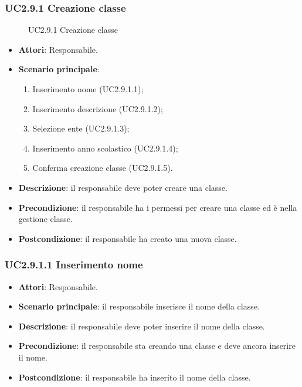 \subsubsection{UC2.9.1 Creazione classe}
\begin{figure}[H]
\centering
\noindent{}
\caption{UC2.9.1 Creazione classe}
\end{figure}
\begin{itemize}
\item \textbf{Attori}: Responsabile.
\item \textbf{Scenario principale}:
\begin{enumerate}
\item Inserimento nome (UC2.9.1.1);
\item Inserimento descrizione (UC2.9.1.2);
\item Selezione ente (UC2.9.1.3);
\item Inserimento anno scolastico (UC2.9.1.4);
\item Conferma creazione classe (UC2.9.1.5).
\end{enumerate}
\item \textbf{Descrizione}: il responsabile deve poter creare una classe.
\item \textbf{Precondizione}: il responsabile ha i permessi per creare una classe ed è nella gestione classe.
\item \textbf{Postcondizione}: il responsabile ha creato una nuova classe.
\end{itemize}
\subsubsection{UC2.9.1.1 Inserimento nome}
\begin{itemize}
\item \textbf{Attori}: Responsabile.
\item \textbf{Scenario principale}: il responsabile inserisce il nome della classe.
\item \textbf{Descrizione}: il responsabile deve poter inserire il nome della classe.
\item \textbf{Precondizione}: il responsabile sta creando una classe e deve ancora inserire il nome.
\item \textbf{Postcondizione}: il responsabile ha inserito il nome della classe.
\end{itemize}
